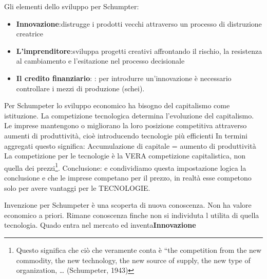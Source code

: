\documentclass{article}
\begin{document}
Gli elementi dello sviluppo per Schumpter:
\begin{itemize}
    \item \textbf{Innovazione}:distrugge i prodotti vecchi attraverso un processo di distruzione creatrice
    \item \textbf{L'imprenditore}:sviluppa progetti creativi affrontando il rischio, la resistenza al cambiamento e l'esitazione nel processo decisionale
    \item \textbf{Il credito finanziario}: : per introdurre un’innovazione è necessario controllare i mezzi di produzione (schei).
\end{itemize}
Per Schumpeter lo sviluppo economico ha bisogno del capitalismo come
istituzione. La competizione tecnologica determina l’evoluzione del capitalismo. 
Le imprese mantengono o migliorano la loro posizione competitiva attraverso aumenti
di produttività, cioè introducendo tecnologie più efficienti
In termini aggregati questo significa:
Accumulazione di capitale = aumento di produttività
La competizione per le tecnologie è la VERA competizione capitalistica, non quella
dei prezzi\footnote{Questo significa che ciò che veramente conta è “the competition from the new commodity, the
new technology, the new source of supply, the new type of organization, … (Schumpeter, 1943)}.
Conclusione: e condividiamo questa impostazione logica la conclusione e che le imprese competano per il prezzo, in realtà esse competono solo per avere vantaggi per le TECNOLOGIE. 

Invenzione per Schumpeter è una scoperta di nuova conoscenza. Non ha valore economico a priori. Rimane conoscenza finche non si individuta l utilita di quella tecnologia. Quado  entra nel mercato ed inventa\textbf{Innovazione}
\end{document}
